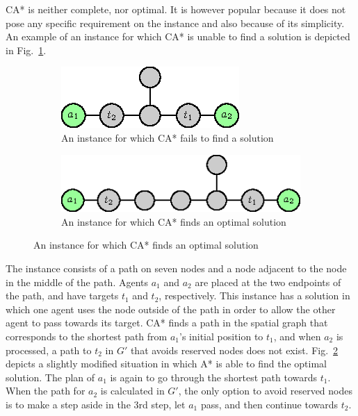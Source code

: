CA* is neither complete, nor optimal. It is however popular because it does not pose any specific requirement on the instance and also because of its simplicity.
An example of an instance for which CA* is unable to find a solution is depicted in Fig.~\ref{fig:castarfail}.
\begin{figure}
    \centering
    \begin{subfigure}[b]{0.48\textwidth}
        \includegraphics{figurer/castarfail.eps}
        \caption{An instance for which CA* fails to find a solution}
        \label{fig:castarfail}
    \end{subfigure}\hspace{5mm}
    \begin{subfigure}[b]{0.48\textwidth}
        \includegraphics{figurer/castarnofail.eps}
        \caption{An instance for which CA* finds an optimal solution}
        \label{fig:castarnofail}
    \end{subfigure}
  \label{fig:omni}
\end{figure}
The instance consists of a path on seven nodes and a node adjacent to the node in the middle of the path.
Agents $a_1$ and $a_2$ are placed at the two endpoints of the path, and have targets $t_1$ and $t_2$, respectively.
This instance has a solution in which one agent uses the node outside of the path in order to allow the other agent to pass towards its target.
CA* finds a path in the spatial graph that corresponds to the shortest path from $a_1$'s initial position to $t_1$, and when $a_2$ is processed,
a path to $t_2$ in $G'$ that avoids reserved nodes does not exist.
Fig.~\ref{fig:castarnofail} depicts a slightly modified situation in which A* is able to find the optimal solution.
The plan of $a_1$ is again to go through the shortest path towards $t_1$.
When the path for $a_2$ is calculated in $G'$, the only option to avoid reserved nodes is to make a step aside in the 3rd step, let $a_1$ pass, and then continue towards $t_2$.

